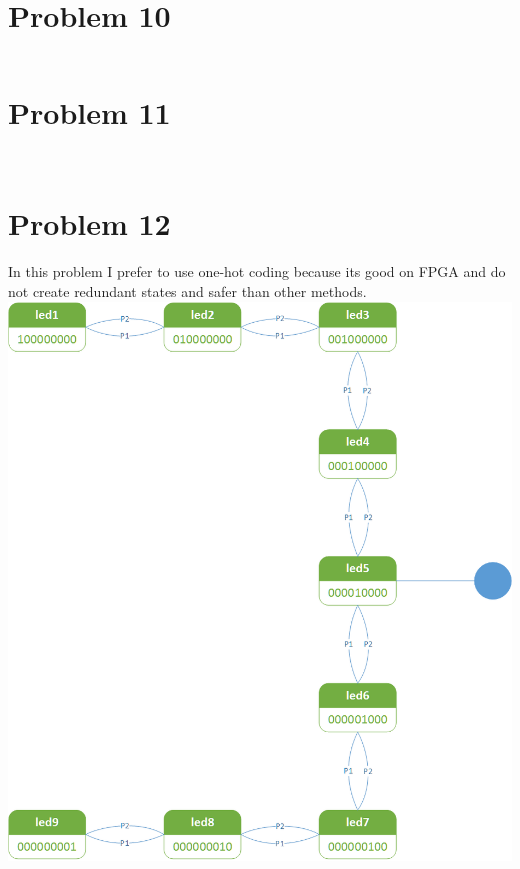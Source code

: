 \documentclass[paper=a4, fontsize=11pt]{scrartcl} %
\numberwithin{equation}{section} %
\numberwithin{figure}{section} %
\numberwithin{table}{section} %
\begin{document}
\section{Problem 10}
\inputminted{vhdl}{src/p10/p10.vhd}


\section{Problem 11}
\inputminted{vhdl}{src/p11/p11-in.vhd}
\inputminted{vhdl}{src/p11/p11-out.vhd}


\section{Problem 12}
\par In this problem I prefer to use one-hot coding because its good on FPGA
and do not create redundant states and safer than other methods.
\center\includegraphics[]{p12.png}
\inputminted{vhdl}{src/p12/p12.vhd}
\inputminted{vhdl}{src/p12/p12_t.vhd}
\end{document}
